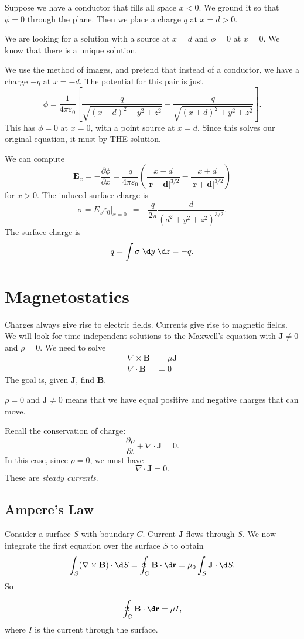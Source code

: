 \documentclass[a4paper]{article}
\begin{document}
\begin{enumerate}
\begin{eg}
      Suppose we have a conductor that fills all space $x < 0$. We ground it so that $\phi = 0$ through the plane. Then we place a charge $q$ at $x = d > 0$.

      We are looking for a solution with a source at $x = d$ and $\phi = 0$ at $x = 0$. We know that there is a unique solution.

      We use the method of images, and pretend that instead of a conductor, we have a charge $-q$ at $x = -d$. The potential for this pair is just
      \[
        \phi = \frac{1}{4\pi\varepsilon_0}\left[\frac{q}{\sqrt{(x - d)^2 + y^2 + z^2}} - \frac{q}{\sqrt{(x + d)^2 + y^2 + z^2}}\right].
      \]
      This has $\phi = 0$ at $x = 0$, with a point source at $x = d$. Since this solves our original equation, it must by THE solution.

      We can compute
      \[
        \mathbf{E}_x = -\frac{\partial \phi}{\partial x} = \frac{q}{4\pi\varepsilon_0}\left(\frac{x - d}{|\mathbf{r} - \mathbf{d}|^{3/2}} - \frac{x + d}{|\mathbf{r} + \mathbf{d}|^{3/2}}\right)
      \]
      for $x > 0$. The induced surface charge is
      \[
        \sigma = E_x\varepsilon_0|_{x = 0^+} = -\frac{q}{2\pi}\frac{d}{(d^2 + y^2 + z^2)^{3/2}}.
      \]
      The surface charge is 
      \[
        q = \int \sigma \;\d y\;\d z  = -q.
      \]
    \end{eg}
\end{enumerate}
\section{Magnetostatics}
Charges always give rise to electric fields. Currents give rise to magnetic fields. We will look for time independent solutions to the Maxwell's equation with $\mathbf{J}\not= 0$ and $\rho = 0$. We need to solve
\begin{align*}
  \nabla \times \mathbf{B} &= \mu \mathbf{J}\\
  \nabla\cdot \mathbf{B} &= 0
\end{align*}
The goal is, given $\mathbf{J}$, find $\mathbf{B}$.

\note $\rho = 0$ and $\mathbf{J} \not= 0$ means that we have equal positive and negative charges that can move.

Recall the conservation of charge:
\[
  \frac{\partial\rho}{\partial t} + \nabla \cdot \mathbf{J} = 0.
\]
In this case, since $\rho = 0$, we must have
\[
  \nabla\cdot \mathbf{J} = 0.
\]
These are \emph{steady currents}.
\subsection{Ampere's Law}
Consider a surface $S$ with boundary $C$. Current $\mathbf{J}$ flows through $S$. We now integrate the first equation over the surface $S$ to obtain
\[
  \int_S (\nabla\times \mathbf{B})\cdot \d S = \oint_C \mathbf{B}\cdot \d \mathbf{r} = \mu_0 \int_S \mathbf{J}\cdot \d S.
\]
So
\begin{law}
  \[
    \oint_C \mathbf{B}\cdot \d \mathbf{r} = \mu I,
  \]
  where $I$ is the current through the surface.
\end{law}
\end{document}
